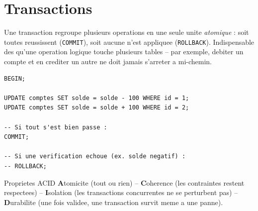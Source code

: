 \documentclass[11pt,a4paper]{article}
\begin{document}
\section{Transactions}
Une transaction regroupe plusieurs operations en une seule unite
\emph{atomique} : soit toutes reussissent (\texttt{COMMIT}), soit aucune n'est
appliquee (\texttt{ROLLBACK}). Indispensable des qu'une operation logique
touche plusieurs tables -- par exemple, debiter un compte et en crediter un
autre ne doit jamais s'arreter a mi-chemin.

\begin{lstlisting}
BEGIN;

UPDATE comptes SET solde = solde - 100 WHERE id = 1;
UPDATE comptes SET solde = solde + 100 WHERE id = 2;

-- Si tout s'est bien passe :
COMMIT;

-- Si une verification echoue (ex. solde negatif) :
-- ROLLBACK;
\end{lstlisting}

\begin{infobox}{Proprietes ACID}
\textbf{A}tomicite (tout ou rien) -- \textbf{C}oherence (les contraintes
restent respectees) -- \textbf{I}solation (les transactions concurrentes ne se
perturbent pas) -- \textbf{D}urabilite (une fois validee, une transaction
survit meme a une panne).
\end{infobox}

\end{document}

